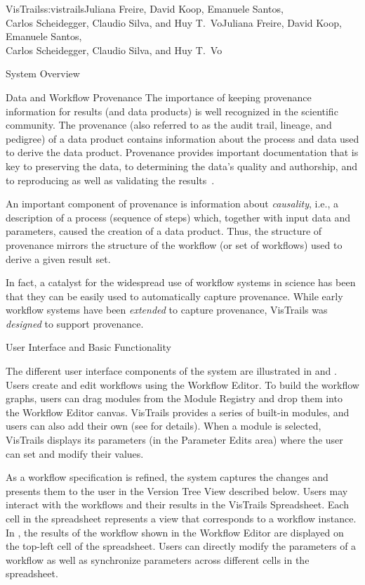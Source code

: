 \begin{aosachaptertoc}{VisTrails}{s:vistrails}{Juliana Freire, David Koop, Emanuele Santos, \\ Carlos Scheidegger, Claudio Silva, and Huy T.\ Vo}{Juliana Freire, David Koop, Emanuele Santos, \\ \hspace*{0.9cm} Carlos Scheidegger, Claudio Silva, and Huy T.\ Vo}
\begin{aosasect1}{System Overview}
\begin{aosasect2}{Data and Workflow Provenance}
The importance of keeping provenance information for results (and data
products) is well recognized in the scientific community.  The
provenance (also referred to as the audit trail, lineage, and
pedigree) of a data product contains information about the process and
data used to derive the data product. Provenance provides important
documentation that is key to preserving the data, to determining the
data's quality and authorship, and to reproducing as well as
validating the results~\cite{bib:freire:provenance}.

An important component of provenance is information about
\emph{causality}, i.e., a description of a process (sequence of steps)
which, together with input data and parameters, caused the creation of
a data product. Thus, the structure of provenance mirrors the
structure of the workflow (or set of workflows) used to derive a given
result set.

In fact, a catalyst for the widespread use of workflow systems in
science has been that they can be easily used to automatically capture
provenance.  While early workflow systems have been \emph{extended} to
capture provenance, VisTrails was \emph{designed} to support
provenance.


\end{aosasect2}

\begin{aosasect2}{User Interface and Basic Functionality}

The different user interface components of the system are illustrated
in  and
. Users create and edit workflows using
the Workflow Editor.
%
To build the workflow graphs, users can drag modules from the Module
Registry and drop them into the Workflow Editor canvas. VisTrails
provides a series of built-in modules, and users can also add their
own (see  for details). When a
module is selected, VisTrails displays its parameters (in the
Parameter Edits area) where the user can set and modify their values.

As a workflow specification is refined, the system captures the
changes and presents them to the user in the Version Tree View
described below.  Users may interact with the workflows and their
results in the VisTrails Spreadsheet.  Each cell in the spreadsheet
represents a view that corresponds to a workflow instance.  In
, the results of the workflow shown
in the Workflow Editor are displayed on the top-left cell of the
spreadsheet.  Users can directly modify the parameters of a workflow
as well as synchronize parameters across different cells in the
spreadsheet.


\end{aosasect2}
\end{aosasect1}
\end{aosachaptertoc}
